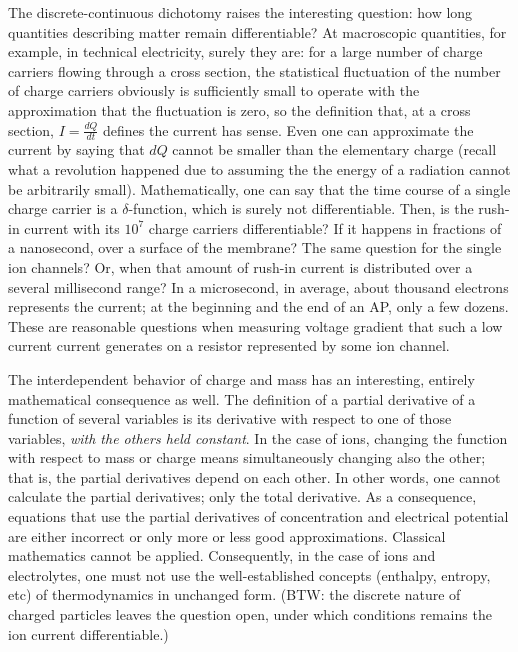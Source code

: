 The discrete-continuous dichotomy raises the interesting question: how long quantities describing matter remain differentiable? At macroscopic quantities, for example, 
in technical electricity, surely they are: for a large number of
charge carriers flowing through a cross section, the statistical
fluctuation of the number of charge carriers obviously is sufficiently small to operate with the approximation that
the fluctuation is zero, so the definition that, at a cross section, $I=\frac{dQ}{dt}$ defines the current has sense.
Even one can approximate the current by saying that
$dQ$ cannot be smaller than the elementary charge 
(recall what a revolution happened due to assuming
the the energy of a radiation cannot be arbitrarily small). Mathematically, one can say that the time course of a single
charge carrier is a $\delta$-function, which is surely not differentiable. Then, is the rush-in current with its 
$10^7$ charge carriers differentiable? If it happens 
in fractions of a nanosecond, over a surface of the membrane?
The same question for the single ion channels?
Or, when that amount of rush-in current is distributed
over a several millisecond range? In a microsecond,
in average, about thousand electrons represents the current;
at the beginning and the end of an \gls{AP}, only a few dozens.
These are reasonable questions when measuring voltage gradient
that such a low current current generates on a resistor
represented by some ion channel. 


The interdependent behavior of charge and mass has an interesting, entirely
mathematical consequence as well. 
The definition of a \hypertarget{PartialDerivative}{partial derivative} of a function of several variables is its derivative with respect to one of those variables,
\textit{with the others held constant}. In the case of ions, changing the function with respect to mass or charge means simultaneously changing also the other; that is, the partial derivatives depend on each other.
In other words, one cannot calculate the partial derivatives; only the total derivative.
As a consequence, equations that use the partial derivatives of concentration and electrical potential are either incorrect or only more or less good approximations. Classical mathematics cannot be applied.
Consequently, in the case of ions and electrolytes, one must not use the well-established concepts (enthalpy, entropy, etc) of thermodynamics in unchanged form. (BTW: the discrete nature of charged particles 
leaves the question open, under which conditions remains the 
ion current differentiable.)


